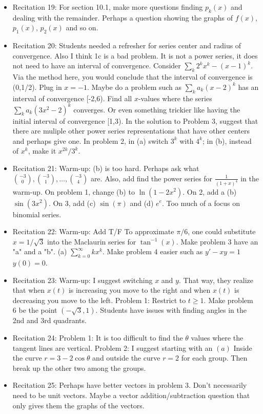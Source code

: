 \documentclass{article}
\begin{document}
\begin{itemize}
\item Recitation 19: For section 10.1, make more questions finding $p_k(x)$ and dealing with the remainder. Perhaps a question showing the graphs of $f(x)$, $p_1(x)$, $p_2(x)$ and so on.  
\item Recitation 20: Students needed a refresher for series center and radius of convergence. Also I think 1c is a bad problem. It is not a power series, it does not need to have an interval of convergence. Consider $\sum_k 2^k x^k - (x-1)^k$. Via the method here, you would conclude that the interval of convergence is (0,1/2). Plug in $x=-1$. Maybe do a problem such as $\sum_k a_k (x-2)^k$ has an interval of convergence [-2,6). Find all $x$-values where the series $\sum_k a_k (3x^2-2)^k$ converges. Or even something trickier like having the initial interval of convergence [1,3).  In the solution to Problem 3, suggest that there are muliple other power series representations that have other centers and perhaps give one. In problem 2, in (a) switch $3^k$ with $4^k$; in (b), instead of $x^k$, make it $x^{2k}/3^k$. 
\item Recitation 21: Warm-up: (b) is too hard. Perhaps ask what ${-3 \choose 0}, {-3 \choose 1}, \ldots, {-3\choose 4}$ are. Also, add find the power series for $\frac{1}{(1+x)^4}$ in the warm-up. On problem 1, change (b) to $\ln (1-2x^2)$. On 2, add a (b) $\sin(3x^2)$. On 3, add (c) $\sin (\pi)$ and (d) $e^e$. Too much of a focus on binomial series.
\item Recitation 22: Warm-up: Add T/F To approximate $\pi/6$, one could substitute $x=1/\sqrt{3}$ into the Maclaurin series for $\tan^{-1}(x)$. Make problem 3 have an "a" and a "b". (a) $\sum_{k=0}^{\infty} k x^k$. Make problem 4 easier such as $y'-xy=1$ $y(0)=0$. 
\item Recitation 23: Warm-up: I suggest switching $x$ and $y$. That way, they realize that when $x(t)$ is increasing you move to the right and when $x(t)$ is decreasing you move to the left. Problem 1: Restrict to $t \geq 1$. Make problem 6 be the point $(-\sqrt{3}, 1)$. Students have issues with finding angles in the 2nd and 3rd quadrants.
\item Recitation 24: Problem 1: It is too difficult to find the $\theta$ values where the tangent lines are vertical. Problem 2: I suggest starting with an $(a)$ Inside the curve $r=3-2\cos \theta$ and outside the curve $r=2$ for each group. Then break up the other two among the groups. 
\item Recitation 25: Perhaps have better vectors in problem 3. Don't necessarily need to be unit vectors. Maybe a vector addition/subtraction question that only gives them the graphs of the vectors. 

\end{itemize}
\end{document}
